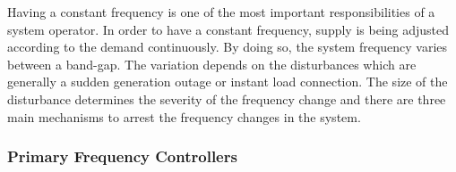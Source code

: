 Having a constant frequency is one of the most important responsibilities of a system operator. In order to have a constant frequency, supply is being adjusted according to the demand continuously. By doing so, the system frequency varies between a band-gap. The variation depends on the disturbances which are generally a sudden generation outage or instant load connection. The size of the disturbance determines the severity of the frequency change and there are three main mechanisms to arrest the frequency changes in the system. 

\subsubsection{Primary Frequency Controllers}